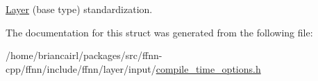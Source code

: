 \hyperlink{classffnn_1_1layer_1_1_layer}{Layer} (base type) standardization. 



The documentation for this struct was generated from the following file\-:\begin{DoxyCompactItemize}
\item 
/home/briancairl/packages/src/ffnn-\/cpp/ffnn/include/ffnn/layer/input/\hyperlink{input_2compile__time__options_8h}{compile\-\_\-time\-\_\-options.\-h}\end{DoxyCompactItemize}
